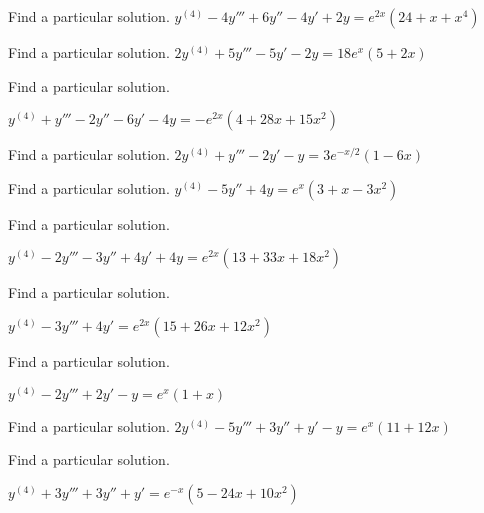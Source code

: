 \documentclass{ximera}
\begin{document}
\begin{problem}\label{exer:9.3.18}   Find a particular solution.   $y^{(4)}-4y'''+6y''-4y'+2y=e^{2x}(24+x+x^4)$
\end{problem}

\begin{problem}\label{exer:9.3.19}   Find a particular solution.   $2y^{(4)}+5y'''-5y'-2y=18e^x(5+2x)$
\end{problem}

\begin{problem}\label{exer:9.3.20}   Find a particular solution.

$y^{(4)}+y'''-2y''-6y'-4y=-e^{2x}(4+28x+15x^2)$
\end{problem}

\begin{problem}\label{exer:9.3.21}   Find a particular solution.   
$2y^{(4)}+y'''-2y'-y=3e^{-x/2}(1-6x)$
\end{problem}

\begin{problem}\label{exer:9.3.22}   Find a particular solution.   
$y^{(4)}-5y''+4y=e^x(3+x-3x^2)$
\end{problem}

\begin{problem}\label{exer:9.3.23}  
Find a particular solution.

$y^{(4)}-2y'''-3y''+4y'+4y=e^{2x}(13+33x+18x^2)$
\end{problem}

\begin{problem}\label{exer:9.3.24}  
Find a particular solution.

$y^{(4)}-3y'''+4y'=e^{2x}(15+26x+12x^2)$
\end{problem}

\begin{problem}\label{exer:9.3.25}   Find a particular solution. 

$y^{(4)}-2y'''+2y'-y=e^x(1+x)$
\end{problem}

\begin{problem}\label{exer:9.3.26}   Find a particular solution.   
$2y^{(4)}-5y'''+3y''+y'-y=e^x(11+12x)$
\end{problem}

\begin{problem}\label{exer:9.3.27}   Find a particular solution.

$y^{(4)}+3y'''+3y''+y'=e^{-x}(5-24x+10x^2)$
\end{problem}
\end{document}
